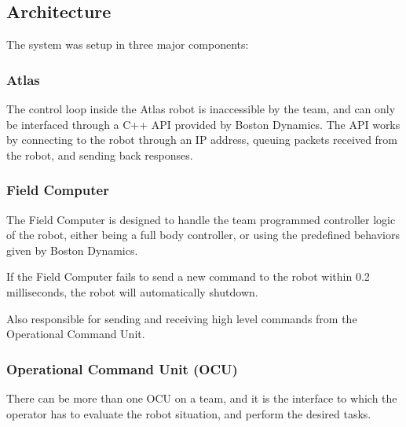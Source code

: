 \documentclass[12pt]{report}
\begin{document}
\subsection{Architecture}

The system was setup in three major components: 

\subsubsection{Atlas}
The control loop inside the Atlas robot is inaccessible by the team, and can only be interfaced through a C++ API provided by Boston Dynamics. The API works by connecting to the robot through an IP address, queuing packets received from the robot, and sending back responses. 

\subsubsection{Field Computer}
The Field Computer is designed to handle the team programmed controller logic of the robot, either being a full body controller, or using the predefined behaviors given by Boston Dynamics. 

If the Field Computer fails to send a new command to the robot within 0.2 milliseconds, the robot will automatically shutdown. 

Also responsible for sending and receiving high level commands from the Operational Command Unit.


\subsubsection{Operational Command Unit (OCU)}


There can be more than one OCU on a team, and it is the interface to which the operator has to evaluate the robot situation, and perform the desired tasks. 


\end{document}
